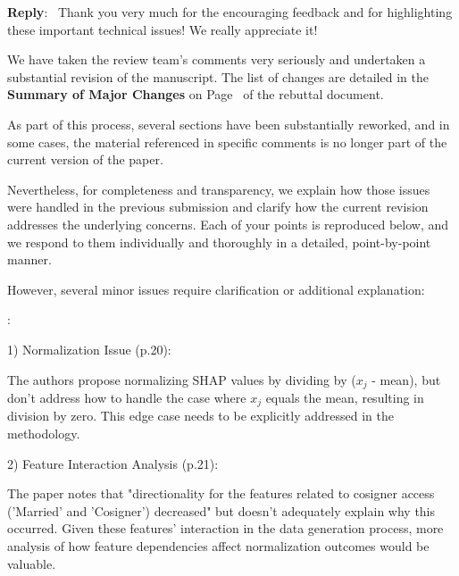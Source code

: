 \documentclass[11pt]{article}
\newcounter{se}[section]
\newcounter{reviewer}
\newcounter{point}[reviewer]
\renewcommand{\thepoint}{R\,\thereviewer.\arabic{point}}
\newenvironment{point}{
    \refstepcounter{point} \bigskip \noindent {\textbf{\thepoint}}: \rmfamily \itshape
}{\medskip}
\newenvironment{point*}{\bigskip \noindent \rmfamily \itshape}{\medskip} %
\newenvironment{reply}
 {\par\medskip \noindent \begin{sf}\textbf{Reply}:\ }
 {\medskip \end{sf}}
\begin{document}
\begin{reply}
Thank you very much for the encouraging feedback and for highlighting these important technical issues! We really appreciate it!

We have taken the review team’s comments very seriously and undertaken a substantial revision of the manuscript.  The list of changes are detailed in the \textbf{Summary of Major Changes} on Page~\pageref{sec:majorchanges} of the rebuttal document. 


As part of this process, several sections have been substantially reworked, and in some cases, the material referenced in specific comments is no longer part of the current version of the paper. 

Nevertheless, for completeness and transparency, we explain how those issues were handled in the previous submission and clarify how the current revision addresses the underlying concerns. Each of your points is reproduced below, and we respond to them individually and thoroughly in a detailed, point-by-point manner.
\end{reply}

\begin{point*}
However, several minor issues require clarification or additional explanation: 
\end{point*}

\begin{point}
1) Normalization Issue (p.20):

The authors propose normalizing SHAP values by dividing by ($x_j$ - mean), but don't address how to handle the case where $x_j$ equals the mean, resulting in division by zero. This edge case needs to be explicitly addressed in the methodology.

2) Feature Interaction Analysis (p.21):

The paper notes that "directionality for the features related to cosigner access ('Married' and 'Cosigner') decreased" but doesn't adequately explain why this occurred. Given these features' interaction in the data generation process, more analysis of how feature dependencies affect normalization outcomes would be valuable.

\end{point}
\end{document}
